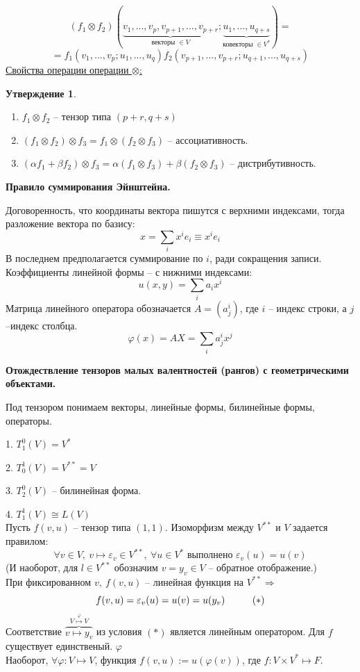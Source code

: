\documentclass[a4paper, 12pt]{article}
\newcommand\tab[1][.5cm]{\hspace*{#1}}
\theoremstyle{definition}
\newtheorem*{subtheorem}{Утверждение}
\begin{document}
    $$(f_1 \otimes f_2)(\underbrace{v_1,...,v_p,v_{p+1},...,v_{p+r}}_{\text{векторы } \in V};\underbrace{u_1,...,u_{q+s}}_{\text{ковекторы } \in V^*}) = $$
    $$= f_1(v_1,...,v_p;u_1,...,u_q)f_2(v_{p+1},...,v_{p+r};u_{q+1},...,u_{q + s})$$
    \underline{Свойства операции операции $\otimes$:}
    \begin{subtheorem}
        \begin{enumerate}
            \item $f_1 \otimes f_2$ -- тензор типа $(p+r,q+s)$
            \item $(f_1 \otimes f_2) \otimes f_3 = f_1 \otimes (f_2 \otimes f_3)$ -- ассоциативность.
            \item $(\alpha f_1 + \beta f_2) \otimes f_3 = \alpha(f_1 \otimes f_3) + \beta(f_2\otimes f_3)$ -- дистрибутивность.
        \end{enumerate}
    \end{subtheorem}    
    \begin{center}
        \textbf{Правило суммирования Эйнштейна.} 
    \end{center}
    Договоренность, что координаты вектора пишутся с верхними индексами, тогда разложение вектора по базису:
    $$x = \sum\limits_{i} x^i e_i \equiv x^i e_i$$
    В последнем предполагается суммирование по $i$, ради сокращения записи.\\
    Коэффициенты линейной формы -- с нижними индексами:
    $$u(x,y) = \sum\limits_{i} a_i x^i$$
    Матрица линейного оператора обозначается $A = (a_j^i)$, где $i$ -- индекс строки, а $j$ --индекс столбца.
    $$\varphi(x) = AX = \sum\limits_{i} a_j^i x^j$$
    \begin{center}
        \textbf{Отождествление тензоров малых валентностей (рангов) с геометрическими объектами.}     
    \end{center}
    Под тензором понимаем векторы, линейные формы, билинейные формы, операторы.

    1. $T_1^0(V) = V^*$

    2. $T_0^1(V) = V^{**} = V$
    
    3. $T_2^0(V)$ -- билинейная форма.

    4. $T_1^1(V) \cong L(V)$\\
    Пусть $f(v,u)$ -- тензор типа $(1,1)$. Изоморфизм между $V^{**}$ и $V$ задается правилом:
    $$\forall v \in V,\ v \longmapsto \varepsilon_v \in V^{**},\ \forall u \in V^* \text{ выполнено } \varepsilon_v(u) = u(v)$$
    (И наоборот, для $l \in V^{**}$ обозначим $v = y_v \in V$ -- обратное отображение.)\\
    При фиксированном $v,\ f(v,u)$ -- линейная функция на $V^{**} \Longrightarrow$ $$f(v,u) = \varepsilon_v(u) = u(v) = u(y_v)\tab[1cm](*)$$
    Соответствие $\overbrace{v \longmapsto y_v}^{V \overset{\varphi}{\longmapsto} V}$ из условия $(*)$ является линейным оператором. Для $f$ существует единственый. $\varphi$\\
    Наоборот, $\forall \varphi: V \longmapsto V$, функция $f(v,u) := u(\varphi(v))$, где $f: V \times V^* \longmapsto  F.$ 
\end{document}
